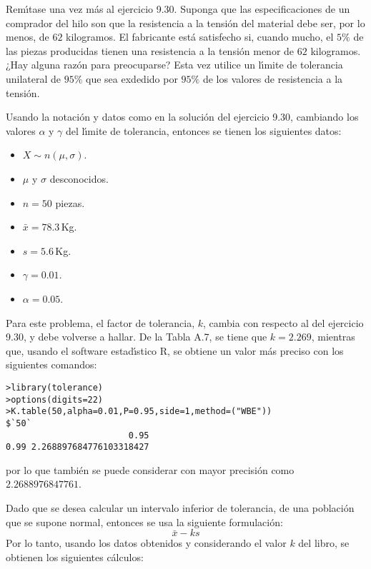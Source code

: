 \begin{enunciado}
 Rem\'{\i}tase una vez m\'as al ejercicio 9.30. Suponga que las especificaciones de un comprador del hilo son que la resistencia a la tensi\'on del material debe ser, por lo menos, de $62$ kilogramos. El fabricante est\'a satisfecho si, cuando mucho, el $5\%$ de las piezas producidas tienen una resistencia a la tensi\'on menor de $62$ kilogramos. ¿Hay alguna raz\'on para preocuparse? Esta vez utilice un l\'{\i}mite de tolerancia unilateral de $95\%$ que sea exdedido por $95\%$ de los valores de resistencia a la tensi\'on.
\end{enunciado}

\begin{solucion}
 Usando la notaci\'on y datos como en la soluci\'on del ejercicio 9.30, cambiando los valores $\alpha$ y $\gamma$ del l\'{\i}mite de tolerancia, entonces se tienen los siguientes datos:
 \begin{itemize}
  \item $X\sim n(\mu, \sigma)$.
  \item $\mu$ y $\sigma$ desconocidos.
  \item $n=50$ piezas.
  \item $\bar{x} = 78.3\,$Kg.
  \item $s=5.6\,$Kg.
  \item $\gamma = 0.01$.
  \item $\alpha = 0.05$.
 \end{itemize}
 Para este problema, el factor de tolerancia, $k$, cambia con respecto al del ejercicio 9.30, y debe volverse a hallar. De la Tabla A.7, se tiene que $k= 2.269$, mientras que, usando el software estad\'{\i}stico R, se obtiene un valor m\'as preciso con los siguientes comandos:
 \begin{verbatim}
>library(tolerance)
>options(digits=22)
>K.table(50,alpha=0.01,P=0.95,side=1,method=("WBE"))
$`50`
                        0.95
0.99 2.268897684776103318427
 \end{verbatim}
 \vspace{-0.5cm}
 por lo que tambi\'en se puede considerar con mayor precisi\'on como $2.2688976847761$.
 \par 
 Dado que se desea calcular un intervalo inferior de tolerancia, de una poblaci\'on que se supone normal, entonces se usa la siguiente formulaci\'on:
 \begin{equation*}
  \bar{x} - ks
 \end{equation*}
 Por lo tanto, usando los datos obtenidos y considerando el valor $k$ del libro, se obtienen los siguientes c\'alculos:

\end{solucion}
